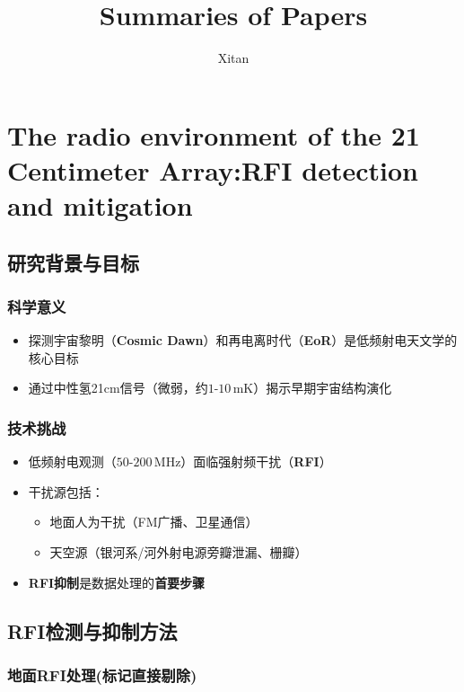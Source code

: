 \documentclass{article}
\title{Summaries of Papers}
\author{Xitan}
\begin{document}
\maketitle
\section{The radio environment of the 21 Centimeter Array:RFI detection and mitigation}
\subsection{研究背景与目标}
\subsubsection{科学意义}
\begin{itemize}
    \item 探测宇宙黎明（\textbf{Cosmic Dawn}）和再电离时代（\textbf{EoR}）是低频射电天文学的核心目标
    \item 通过中性氢21cm信号（微弱，约$1$-$10\,\mathrm{mK}$）揭示早期宇宙结构演化
\end{itemize}

\subsubsection{技术挑战}
\begin{itemize}
    \item 低频射电观测（$50$-$200\,\mathrm{MHz}$）面临强射频干扰（\textbf{RFI}）
    \item 干扰源包括：
    \begin{itemize}
        \item 地面人为干扰（FM广播、卫星通信）
        \item 天空源（银河系/河外射电源旁瓣泄漏、栅瓣）
    \end{itemize}
    \item \textbf{RFI抑制}是数据处理的\textbf{首要步骤}
\end{itemize}

\subsection{RFI检测与抑制方法}
\subsubsection{地面RFI处理(标记直接剔除)}
\end{document}
